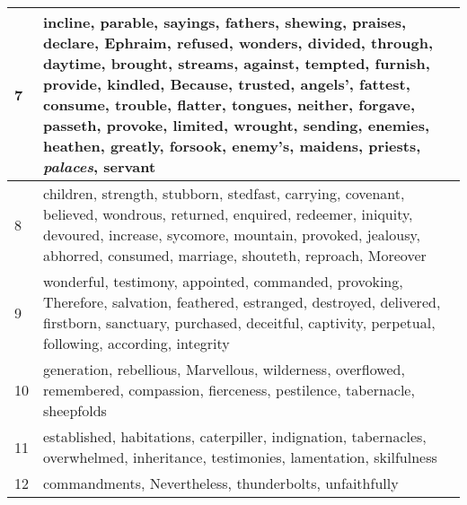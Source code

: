 \begin{center}
\begin{longtable}{l|p{3.75in}}
7 & incline, parable, sayings, fathers, shewing, praises, declare, Ephraim, refused, wonders, divided, through, daytime, brought, streams, against, tempted, furnish, provide, kindled, Because, trusted, angels', fattest, consume, trouble, flatter, tongues, neither, forgave, passeth, provoke, limited, wrought, sending, enemies, heathen, greatly, forsook, enemy's, maidens, priests, \emph{palaces}, servant\\ \hline 
8 & children, strength, stubborn, stedfast, carrying, covenant, believed, wondrous, returned, enquired, redeemer, iniquity, devoured, increase, sycomore, mountain, provoked, jealousy, abhorred, consumed, marriage, shouteth, reproach, Moreover\\ \hline 
9 & wonderful, testimony, appointed, commanded, provoking, Therefore, salvation, feathered, estranged, destroyed, delivered, firstborn, sanctuary, purchased, deceitful, captivity, perpetual, following, according, integrity\\ \hline 
10 & generation, rebellious, Marvellous, wilderness, overflowed, remembered, compassion, fierceness, pestilence, tabernacle, sheepfolds\\ \hline 
11 & established, habitations, caterpiller, indignation, tabernacles, overwhelmed, inheritance, testimonies, lamentation, skilfulness\\ \hline 
12 & commandments, Nevertheless, thunderbolts, unfaithfully\\ \hline 
\end{longtable}
\end{center}






